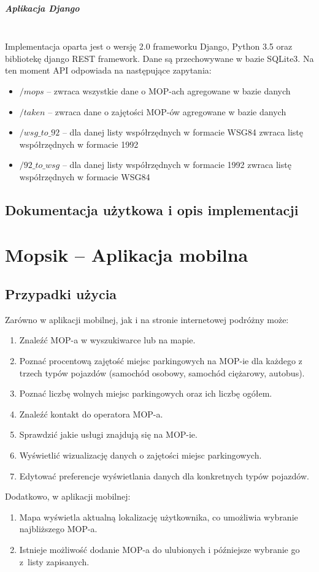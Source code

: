 \paragraph{Aplikacja Django}\mbox{}\\
Implementacja oparta jest o wersję 2.0 frameworku Django, Python 3.5 oraz bibliotekę django REST framework. Dane są przechowywane w bazie SQLite3. Na ten moment API odpowiada na następujące zapytania:
\begin{itemize}
\item $/mops$ -- zwraca wszystkie dane o MOP-ach agregowane w bazie danych
\item $/taken$ -- zwraca dane o zajętości MOP-ów agregowane w bazie danych
\item $/wsg\_to\_92$ -- dla danej listy współrzędnych w formacie WSG84 zwraca listę współrzędnych w formacie 1992
\item $/92\_to\_wsg$ -- dla danej listy współrzędnych w formacie 1992 zwraca listę współrzędnych w formacie WSG84
\end{itemize}

\section{Dokumentacja użytkowa i opis implementacji}


\chapter{Mopsik -- Aplikacja mobilna}
\label{mopsik_mobile}

\section{Przypadki użycia}
\label{mopsik_usecase}
Zarówno w aplikacji mobilnej, jak i na stronie internetowej podróżny może:
\begin{enumerate}
\item Znaleźć MOP-a w wyszukiwarce lub na mapie.
\item Poznać procentową zajętość miejsc parkingowych na MOP-ie dla każdego z trzech typów pojazdów (samochód osobowy, samochód ciężarowy, autobus).
\item Poznać liczbę wolnych miejsc parkingowych oraz ich liczbę ogółem.
\item Znaleźć kontakt do operatora MOP-a.
\item Sprawdzić jakie usługi znajdują się na MOP-ie.
\item Wyświetlić wizualizację danych o zajętości miejsc parkingowych.
\item Edytować preferencje wyświetlania danych dla konkretnych typów pojazdów.
\end{enumerate}
Dodatkowo, w aplikacji mobilnej:
\begin{enumerate}
\item Mapa wyświetla aktualną lokalizację użytkownika, co umożliwia wybranie najbliższego MOP-a. 
\item Istnieje możliwość dodanie MOP-a do ulubionych i późniejsze wybranie go z~listy zapisanych.
\end{enumerate}



